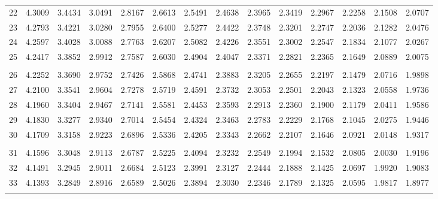 {\begin{tabular}{l|lllllllllllll}
 22 & 4.3009 & 3.4434 & 3.0491 & 2.8167 & 2.6613 & 2.5491 & 2.4638 & 2.3965 & 2.3419 & 2.2967 & 2.2258 & 2.1508 & 2.0707 \\[5pt] \arrayrulecolor{light-gray}\hline\arrayrulecolor{black}  
 23 & 4.2793 & 3.4221 & 3.0280 & 2.7955 & 2.6400 & 2.5277 & 2.4422 & 2.3748 & 2.3201 & 2.2747 & 2.2036 & 2.1282 & 2.0476 \\[5pt] \arrayrulecolor{light-gray}\hline\arrayrulecolor{black}  
 24 & 4.2597 & 3.4028 & 3.0088 & 2.7763 & 2.6207 & 2.5082 & 2.4226 & 2.3551 & 2.3002 & 2.2547 & 2.1834 & 2.1077 & 2.0267 \\[5pt] \arrayrulecolor{light-gray}\hline\arrayrulecolor{black}  
 25 & 4.2417 & 3.3852 & 2.9912 & 2.7587 & 2.6030 & 2.4904 & 2.4047 & 2.3371 & 2.2821 & 2.2365 & 2.1649 & 2.0889 & 2.0075 \\[5pt] \arrayrulecolor{light-gray}\hline\arrayrulecolor{black}  
\\ 
 26 & 4.2252 & 3.3690 & 2.9752 & 2.7426 & 2.5868 & 2.4741 & 2.3883 & 2.3205 & 2.2655 & 2.2197 & 2.1479 & 2.0716 & 1.9898 \\[5pt] \arrayrulecolor{light-gray}\hline\arrayrulecolor{black}  
 27 & 4.2100 & 3.3541 & 2.9604 & 2.7278 & 2.5719 & 2.4591 & 2.3732 & 2.3053 & 2.2501 & 2.2043 & 2.1323 & 2.0558 & 1.9736 \\[5pt] \arrayrulecolor{light-gray}\hline\arrayrulecolor{black}  
 28 & 4.1960 & 3.3404 & 2.9467 & 2.7141 & 2.5581 & 2.4453 & 2.3593 & 2.2913 & 2.2360 & 2.1900 & 2.1179 & 2.0411 & 1.9586 \\[5pt] \arrayrulecolor{light-gray}\hline\arrayrulecolor{black}  
 29 & 4.1830 & 3.3277 & 2.9340 & 2.7014 & 2.5454 & 2.4324 & 2.3463 & 2.2783 & 2.2229 & 2.1768 & 2.1045 & 2.0275 & 1.9446 \\[5pt] \arrayrulecolor{light-gray}\hline\arrayrulecolor{black}  
 30 & 4.1709 & 3.3158 & 2.9223 & 2.6896 & 2.5336 & 2.4205 & 2.3343 & 2.2662 & 2.2107 & 2.1646 & 2.0921 & 2.0148 & 1.9317 \\[5pt] \arrayrulecolor{light-gray}\hline\arrayrulecolor{black}  
\\ 
 31 & 4.1596 & 3.3048 & 2.9113 & 2.6787 & 2.5225 & 2.4094 & 2.3232 & 2.2549 & 2.1994 & 2.1532 & 2.0805 & 2.0030 & 1.9196 \\[5pt] \arrayrulecolor{light-gray}\hline\arrayrulecolor{black}  
 32 & 4.1491 & 3.2945 & 2.9011 & 2.6684 & 2.5123 & 2.3991 & 2.3127 & 2.2444 & 2.1888 & 2.1425 & 2.0697 & 1.9920 & 1.9083 \\[5pt] \arrayrulecolor{light-gray}\hline\arrayrulecolor{black}  
 33 & 4.1393 & 3.2849 & 2.8916 & 2.6589 & 2.5026 & 2.3894 & 2.3030 & 2.2346 & 2.1789 & 2.1325 & 2.0595 & 1.9817 & 1.8977 \\[5pt] \arrayrulecolor{light-gray}\hline\arrayrulecolor{black}  

\end{tabular}}
